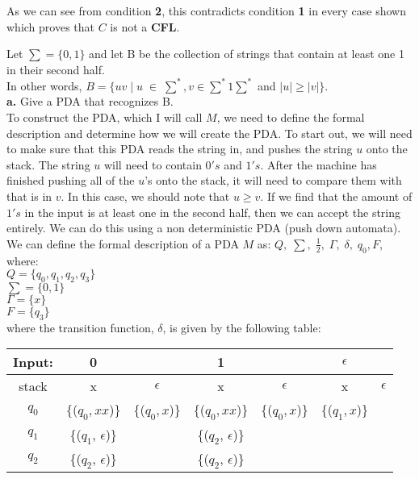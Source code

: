 \documentclass[12pt]{article}
\begin{document}
As we can see from condition \textbf{2}, this contradicts condition \textbf{1} 
in every case shown which proves that $C$ is not a \textbf{CFL}.

 Let $\sum = \{0, 1\}$ and let B be the collection of strings that contain at least one 1 in
their second half. \\
In other words, $B = \{uv \; | \; u \; \in \; \sum^*, v \in \sum^*1\sum^*$ and $|u| \geq |v|\} $. \\

\textbf{a.} Give a PDA that recognizes B. \\

To construct the PDA, which I will call $M$, we need to define the formal
description and determine how we will create the PDA. To start out,
we will need to make sure that this PDA reads the string in, and pushes
the string $u$ onto the stack. The string $u$ will need to contain $0's$
and $1's$. After the machine has finished pushing all of the $u$'s onto
the stack, it will need to compare them with that is in $v$. In this case,
we should note that $u \geq v$. If we find that the amount of $1's$ in
the input is at least one in the second half, then we can accept the string
entirely. We can do this using a non deterministic PDA (push down automata). \\

We can define the formal description of a PDA $M$ as: 
$Q, \; \sum, \; \frac{1}{2}, \; \Gamma, \; \delta, \; q_0, F $, where: \\

$Q = \{q_0, q_1, q_2, q_3\}$ \\
$\sum = \{0, 1 \}$ \\
$\Gamma = \{ x \}$ \\
$F = \{ q_3 \}$ \\

where the transition function, $\delta$,  is given by the following table: \\

\begin{tabularx}{\textwidth}{ c | c c | c c | c c }
Input: & 0 & & 1 & & $\epsilon$ \\
\hline
stack & x & $\epsilon$ & x & $\epsilon$ & x & $\epsilon$ \\
\hline
$q_0$ & \{($q_0, xx$)\} & \{($q_0, x$)\} & \{($q_0, xx$)\} & \{($q_0, x$)\} 
& \{($q_1, x$)\} & \\
\hline
$q_1$ & \{($q_1$, $\epsilon$)\} & & \{($q_2$, $\epsilon$)\} & & & \\
\hline
$q_2$ & \{($q_2$, $\epsilon$)\} & & \{($q_2$, $\epsilon$)\} & & & \\ 
\end{tabularx} \\
\end{document}
